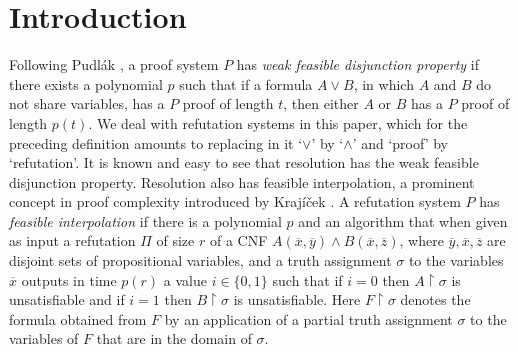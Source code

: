 




































































\section{Introduction}

Following Pudl\'ak \cite{Pudlak2003}, a proof system $P$ has \emph{weak feasible disjunction property} if there exists a polynomial $p$ such that if a formula $A \lor B$, in which $A$ and $B$ do not share variables, has a $P$ proof of length $t$, then either $A$ or $B$ has a $P$ proof of length $p(t)$. We deal with refutation systems in this paper, which for the preceding definition amounts to replacing in it `$\lor$' by `$\land$' and `proof' by `refutation'. It is known and easy to see that resolution has the weak feasible disjunction property. Resolution also has feasible interpolation, a prominent concept in proof complexity introduced by Kraj\'{i}\v{c}ek \cite{Krajicek1994, Krajicek1997}. A refutation system $P$ has \emph{feasible interpolation} if there is a polynomial $p$ and an algorithm that when given as input a refutation $\Pi$ of size $r$ of a CNF $A(\overline{x}, \overline{y}) \land B(\overline{x}, \overline{z})$, where $\overline{y}, \overline{x}, \overline{z}$ are disjoint sets of propositional variables, and a truth assignment $\sigma$ to the variables $\overline{x}$ outputs in time $p(r)$ a value $i \in \{0,1\}$ such that if $i=0$ then $A \! \restriction \! \sigma$ is unsatisfiable and if $i=1$ then $B \! \restriction \! \sigma$ is unsatisfiable. Here $F \! \restriction \! \sigma$ denotes the formula obtained from $F$ by an application of a partial truth assignment $\sigma$ to the variables of $F$ that are in the domain of $\sigma$.

